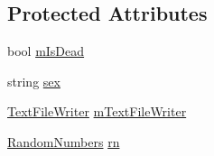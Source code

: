 \subsection*{Protected Attributes}
\begin{DoxyCompactItemize}
\item 
bool \hyperlink{class_s_e_a_r_c_h_1_1_animal_a61211c92eed61826dffce1f84ef2e9f7}{m\-Is\-Dead}
\item 
string \hyperlink{class_s_e_a_r_c_h_1_1_animal_a6413b3476285ade80de97ff798445501}{sex}
\item 
\hyperlink{class_s_e_a_r_c_h_1_1_text_file_writer}{Text\-File\-Writer} \hyperlink{class_s_e_a_r_c_h_1_1_animal_adfbacc7101ae5d23be518f3adea3c894}{m\-Text\-File\-Writer}
\item 
\hyperlink{class_s_e_a_r_c_h_1_1_random_numbers}{Random\-Numbers} \hyperlink{class_s_e_a_r_c_h_1_1_animal_afbbfd34bac637b6560a90d91591b8288}{rn}
\end{DoxyCompactItemize}
